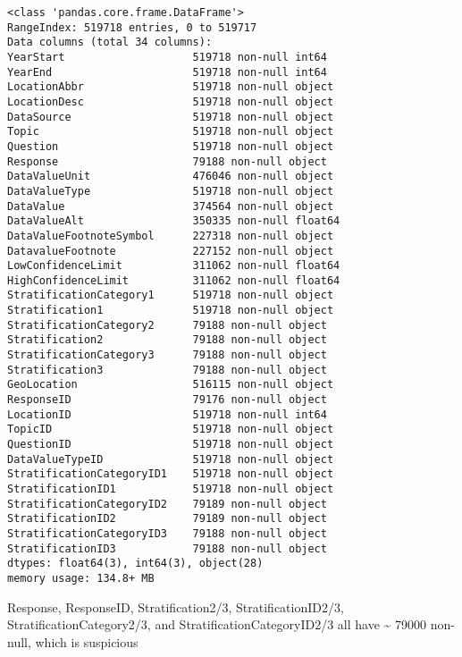 \documentclass[11pt]{article}
\begin{document}
    \begin{Verbatim}[commandchars=\\\{\}]
<class 'pandas.core.frame.DataFrame'>
RangeIndex: 519718 entries, 0 to 519717
Data columns (total 34 columns):
YearStart                    519718 non-null int64
YearEnd                      519718 non-null int64
LocationAbbr                 519718 non-null object
LocationDesc                 519718 non-null object
DataSource                   519718 non-null object
Topic                        519718 non-null object
Question                     519718 non-null object
Response                     79188 non-null object
DataValueUnit                476046 non-null object
DataValueType                519718 non-null object
DataValue                    374564 non-null object
DataValueAlt                 350335 non-null float64
DataValueFootnoteSymbol      227318 non-null object
DatavalueFootnote            227152 non-null object
LowConfidenceLimit           311062 non-null float64
HighConfidenceLimit          311062 non-null float64
StratificationCategory1      519718 non-null object
Stratification1              519718 non-null object
StratificationCategory2      79188 non-null object
Stratification2              79188 non-null object
StratificationCategory3      79188 non-null object
Stratification3              79188 non-null object
GeoLocation                  516115 non-null object
ResponseID                   79176 non-null object
LocationID                   519718 non-null int64
TopicID                      519718 non-null object
QuestionID                   519718 non-null object
DataValueTypeID              519718 non-null object
StratificationCategoryID1    519718 non-null object
StratificationID1            519718 non-null object
StratificationCategoryID2    79189 non-null object
StratificationID2            79189 non-null object
StratificationCategoryID3    79188 non-null object
StratificationID3            79188 non-null object
dtypes: float64(3), int64(3), object(28)
memory usage: 134.8+ MB

    \end{Verbatim}

    Response, ResponseID, Stratification2/3, StratificationID2/3,
StratificationCategory2/3, and StratificationCategoryID2/3 all have
\textasciitilde{} 79000 non-null, which is suspicious
\end{document}
